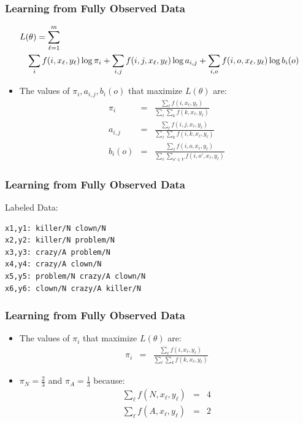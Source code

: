 \begin{frame}
\frametitle{Learning from Fully Observed Data}
{\small\begin{eqnarray*}
\lefteqn{L(\theta) = \sum_{\ell=1}^m  } \\
&& \sum_i f(i,x_\ell,y_\ell) \log \pi_i + \sum_{i,j} f(i,j,x_\ell,y_\ell) \log a_{i,j} + \sum_{i,o} f(i,o,x_\ell,y_\ell) \log b_i(o) \end{eqnarray*}}
\begin{itemize}[<+->]
\item The values of $\pi_i, a_{i,j}, b_i(o)$ that maximize $L(\theta)$ are:
\begin{eqnarray*}
\pi_i & = & \frac{\sum_\ell f(i,x_\ell,y_\ell)}{\sum_\ell \sum_k f(k,x_\ell,y_\ell)} \\
a_{i,j} & = & \frac{\sum_\ell f(i,j,x_\ell,y_\ell)}{\sum_\ell \sum_k f(i,k,x_\ell,y_\ell)} \\
b_i(o) & = & \frac{\sum_\ell f(i,o,x_\ell,y_\ell)}{\sum_\ell \sum_{o' \in V} f(i,o',x_\ell,y_\ell)} 
\end{eqnarray*}
\end{itemize}
\end{frame}


\begin{frame}[fragile]
\frametitle{Learning from Fully Observed Data}
\begin{block}{Labeled Data:}
\begin{verbatim}
x1,y1: killer/N clown/N       
x2,y2: killer/N problem/N     
x3,y3: crazy/A problem/N
x4,y4: crazy/A clown/N
x5,y5: problem/N crazy/A clown/N
x6,y6: clown/N crazy/A killer/N
\end{verbatim}
\end{block}
\end{frame}

\begin{frame}
\frametitle{Learning from Fully Observed Data}
\begin{itemize}[<+->]
\item The values of $\pi_i$ that maximize $L(\theta)$ are:
\begin{eqnarray*}
\pi_i & = & \frac{\sum_\ell f(i,x_\ell,y_\ell)}{\sum_\ell \sum_k f(k,x_\ell,y_\ell)} 
\end{eqnarray*}
\item $\pi_N = \frac{2}{3}$ and $\pi_A = \frac{1}{3}$ because:
\begin{eqnarray*}
\sum_\ell f(N, x_\ell, y_\ell) & = & 4 \\
\sum_\ell f(A, x_\ell, y_\ell) & = & 2 
\end{eqnarray*}
\end{itemize}
\end{frame}

